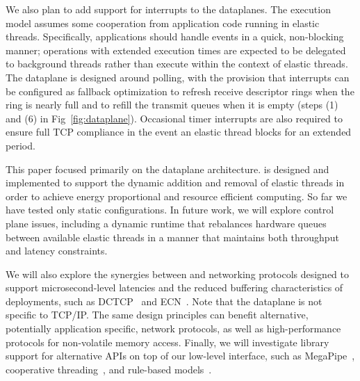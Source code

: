 We also plan to add support for interrupts to the \ix dataplanes. The
\ix execution model assumes some cooperation from application code
running in elastic threads.  Specifically, applications should handle
events in a quick, non-blocking manner; operations with extended
execution times are expected to be delegated to background threads
rather than execute within the context of elastic threads.  The \ix
dataplane is designed around polling, with the provision that
interrupts can be configured as fallback optimization to refresh
receive descriptor rings when the ring is nearly full and to refill
the transmit queues when it is empty (steps (1) and (6) in
Fig~\ref{fig:dataplane}). Occasional timer interrupts are also
required to ensure full TCP compliance in the event an elastic thread
blocks for an extended period.

 This paper focused primarily on the \ix
dataplane architecture. \ix is designed and implemented to support the
dynamic addition and removal of elastic threads in order to achieve
energy proportional and resource efficient computing. So far we have
tested only static configurations. In future work, we will explore
control plane issues, including a dynamic runtime that rebalances
hardware queues between available elastic threads in a manner that
maintains both throughput and latency constraints.

We will also explore the synergies between \ix and networking
protocols designed to support microsecond-level latencies and the
reduced buffering characteristics of \ix deployments, such as
DCTCP~\cite{DBLP:conf/sigcomm/AlizadehGMPPPSS10} and
ECN~\cite{ramakrishnan2001addition}. Note that the \ix dataplane is
not specific to TCP/IP. The same design principles can benefit
alternative, potentially application specific, network protocols, as
well as high-performance protocols for non-volatile memory
access. Finally, we will investigate library support for alternative
APIs on top of our low-level interface, such as
MegaPipe~\cite{DBLP:conf/osdi/HanMCR12}, cooperative
threading~\cite{DBLP:conf/sosp/BehrenCZNB03}, and rule-based
models~\cite{DBLP:conf/hotos/StutsmanO13}.

